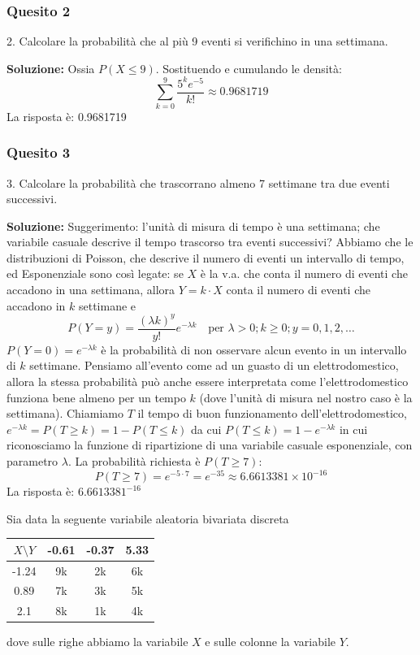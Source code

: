 \documentclass[12pt, a4paper]{article}
\begin{document}
\subsubsection*{Quesito 2}
2. Calcolare la probabilità che al più 9 eventi si verifichino in una settimana.

\textbf{Soluzione:}
Ossia $P(X \leq 9)$. Sostituendo e cumulando le densità:
$$ \sum_{k=0}^9 \frac{5^k e^{-5}}{k!} \approx 0.9681719 $$
La risposta è: 0.9681719

\subsubsection*{Quesito 3}
3. Calcolare la probabilità che trascorrano almeno 7 settimane tra due eventi successivi.

\textbf{Soluzione:}
Suggerimento: l’unità di misura di tempo è una settimana; che variabile casuale descrive il tempo trascorso tra eventi successivi?
Abbiamo che le distribuzioni di Poisson, che descrive il numero di eventi un intervallo di tempo, ed Esponenziale sono così legate:
se $X$ è la v.a. che conta il numero di eventi che accadono in una settimana, allora $Y=k \cdot X$ conta il numero di eventi che accadono in $k$ settimane e 
$$ P(Y=y) = \frac{(\lambda k)^y}{y!} e^{-\lambda k} \quad \text{per } \lambda>0; k \geq 0; y=0,1,2,\dots $$
$P(Y=0) = e^{-\lambda k}$ è la probabilità di non osservare alcun evento in un intervallo di $k$ settimane. Pensiamo all’evento come ad un guasto di un elettrodomestico, allora la stessa probabilità può anche essere interpretata come l’elettrodomestico funziona bene almeno per un tempo $k$ (dove l’unità di misura nel nostro caso è la settimana).
Chiamiamo $T$ il tempo di buon funzionamento dell’elettrodomestico, $e^{-\lambda k} = P(T \geq k) = 1 - P(T \leq k)$ da cui $P(T \leq k) = 1 - e^{-\lambda k}$ in cui riconosciamo la funzione di ripartizione di una variabile casuale esponenziale, con parametro $\lambda$.
La probabilità richiesta è $P(T \geq 7)$:
$$ P(T \geq 7) = e^{-5 \cdot 7} = e^{-35} \approx 6.6613381 \times 10^{-16} $$
La risposta è: $6.6613381^{-16}$


\vspace{0.5cm}
\begin{tcolorbox}[colback=lightergray!10, colframe=tocsec, title=\textbf{Esercizio 11}]
Sia data la seguente variabile aleatoria bivariata discreta 
\begin{center}
\begin{tabular}{c|ccc}
\toprule
$X \setminus Y$ & -0.61 & -0.37 & 5.33 \\
\midrule
-1.24 & 9k & 2k & 6k \\
0.89 & 7k & 3k & 5k \\
2.1 & 8k & 1k & 4k \\
\bottomrule
\end{tabular}
\end{center}
dove sulle righe abbiamo la variabile $X$ e sulle colonne la variabile $Y$.
\end{tcolorbox}
\end{document}
